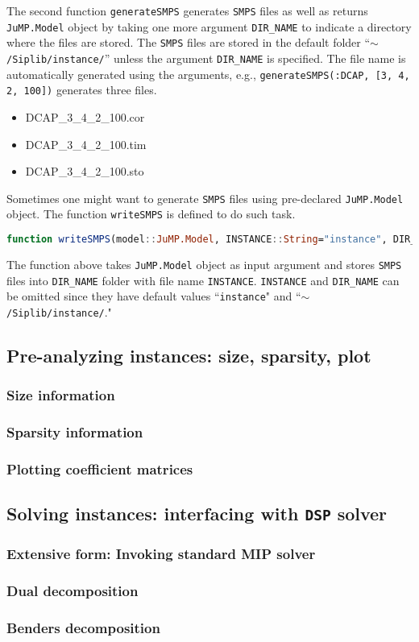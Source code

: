 The second function \texttt{generateSMPS} generates \texttt{SMPS} files as well as returns \texttt{JuMP.Model} object by taking one more argument \texttt{DIR\_NAME} to indicate a directory where the files are stored. The \texttt{SMPS} files are stored in the default folder ``\texttt{$\sim$/Siplib/instance/}'' unless the argument \texttt{DIR\_NAME} is specified. The file name is automatically generated using the arguments, e.g., \texttt{generateSMPS(:DCAP, [3, 4, 2, 100])} generates three files.
\begin{itemize}
	\item DCAP\_3\_4\_2\_100.cor
	\item DCAP\_3\_4\_2\_100.tim
	\item DCAP\_3\_4\_2\_100.sto
\end{itemize}
Sometimes one might want to generate \texttt{SMPS} files using pre-declared \texttt{JuMP.Model} object. The function \texttt{writeSMPS} is defined to do such task.
\begin{lstlisting}[frame=single,language=julia]
function writeSMPS(model::JuMP.Model, INSTANCE::String="instance", DIR_NAME::String="$(dirname(@__FILE__))/../instance")
\end{lstlisting}
The function above takes \texttt{JuMP.Model} object as input argument and stores \texttt{SMPS} files into \texttt{DIR\_NAME} folder with file name \texttt{INSTANCE}. \texttt{INSTANCE} and \texttt{DIR\_NAME} can be omitted since they have default values ``\texttt{instance}" and ``\texttt{$\sim$/Siplib/instance/}."
\subsection{Pre-analyzing instances: size, sparsity, plot}

\subsubsection{Size information}

\subsubsection{Sparsity information}

\subsubsection{Plotting coefficient matrices}

\subsection{Solving instances: interfacing with \texttt{DSP} solver}
\subsubsection{Extensive form: Invoking standard MIP solver}

\subsubsection{Dual decomposition}

\subsubsection{Benders decomposition}